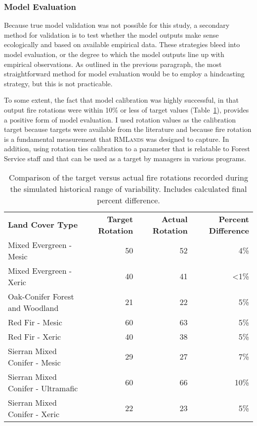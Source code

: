 \subsubsection{Model Evaluation} \label{subsubsec:modelevaluation} Because true model validation was not possible for this study, a secondary method for validation is to test whether the model outputs make sense ecologically and based on available empirical data. These strategies bleed into model evaluation, or the degree to which the model outputs line up with empirical observations. As outlined in the previous paragraph, the most straightforward method for model evaluation would be to employ a hindcasting strategy, but this is not practicable. 

To some extent, the fact that model calibration was highly successful, in that output fire rotations were within 10\% or less of target values (Table~\ref{rotation-diff}), provides a positive form of model evaluation. I used rotation values as the calibration target because targets were available from the literature and because fire rotation is a fundamental measurement that \textsc{RMLands} was designed to capture. In addition, using rotation ties calibration to a parameter that is relatable to Forest Service staff and that can be used as a target by managers in various programs. 

\begin{table}[!htbp]
\centering
\footnotesize
\caption{Comparison of the target versus actual fire rotations recorded during the simulated historical range of variability. Includes calculated final percent difference.}
\label{rotation-diff}
\begin{tabular}{lrrr}
 \textbf{Land Cover Type}           & \textbf{Target Rotation} & \textbf{Actual Rotation} & \textbf{Percent Difference} \\
Mixed Evergreen - Mesic            & 50    & 52    & 4\%   \\
Mixed Evergreen - Xeric            & 40    & 41    & \textless 1\%   \\
Oak-Conifer Forest and Woodland    & 21    & 22    & 5\%   \\
Red Fir - Mesic                    & 60    & 63    & 5\%   \\
Red Fir - Xeric                    & 40    & 38    & 5\%   \\
Sierran Mixed Conifer - Mesic      & 29    & 27    & 7\%   \\
Sierran Mixed Conifer - Ultramafic & 60    & 66    & 10\%  \\
Sierran Mixed Conifer - Xeric      & 22    & 23    & 5\% 
\end{tabular}
\end{table}

